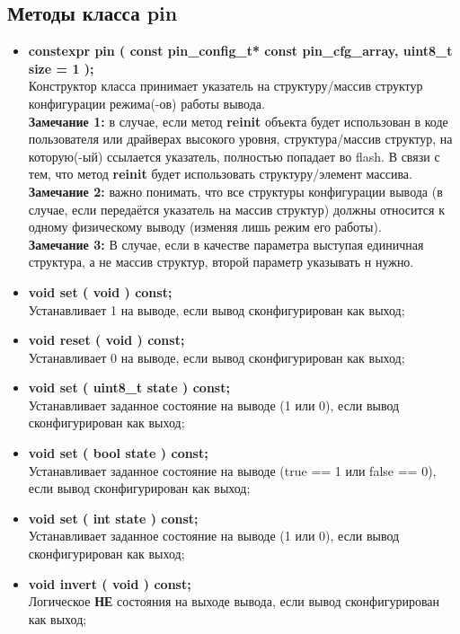 \subsection{Методы класса pin}
\begin{itemize}
	\item \textbf{constexpr pin ( const pin\_config\_t* const pin\_cfg\_array,  uint8\_t size = 1 );}\\Конструктор класса принимает указатель на структуру/массив структур конфигурации режима(-ов) работы  вывода.\\\textbf{Замечание 1: } в случае, если метод \textbf{reinit} объекта будет использован в коде пользователя или драйверах высокого уровня, структура/массив структур, на которую(-ый) ссылается указатель, полностью попадает во flash. В связи с тем, что метод \textbf{reinit} будет использовать структуру/элемент массива.
	\\\textbf{Замечание 2: }важно понимать, что все структуры конфигурации вывода (в случае, если передаётся указатель на массив структур) должны относится к одному физическому выводу (изменяя лишь режим его работы).
	\\\textbf{Замечание 3: }В случае, если в качестве параметра выступая единичная структура, а не массив структур, второй параметр указывать н нужно.
	\item \textbf{void	set		( void ) const;}\\Устанавливает 1 на выводе, если вывод сконфигурирован как выход;
	\item \textbf{void	reset	( void ) const;}\\Устанавливает 0 на выводе, если вывод сконфигурирован как выход;
	\item \textbf{void	set		( uint8\_t state ) const;}\\Устанавливает заданное состояние на выводе (1 или 0), если вывод сконфигурирован как выход;
	\item \textbf{void	set		( bool state ) const;}\\Устанавливает заданное состояние на выводе (true == 1 или false == 0), если вывод сконфигурирован как выход;
	\item \textbf{void	set		( int state ) const;}\\Устанавливает заданное состояние на выводе (1 или 0), если вывод сконфигурирован как выход;
	\item \textbf{void	invert	( void ) const;}\\Логическое \textbf{НЕ} состояния на выходе вывода, если вывод сконфигурирован как выход;

\end{itemize}
